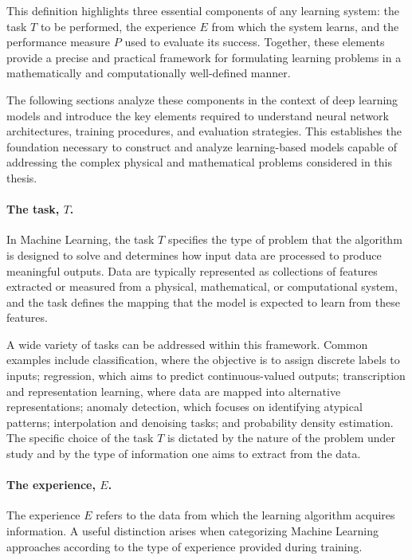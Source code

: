 This definition highlights three essential components of any learning system: the task $T$ to be performed, the experience $E$ from which the system learns, and the performance measure $P$ used to evaluate its success. Together, these elements provide a precise and practical framework for formulating learning problems in a mathematically and computationally well-defined manner.

The following sections analyze these components in the context of deep learning models and introduce the key elements required to understand neural network architectures, training procedures, and evaluation strategies. This establishes the foundation necessary to construct and analyze learning-based models capable of addressing the complex physical and mathematical problems considered in this thesis.

\paragraph{The task, $T$.}
In Machine Learning, the task $T$ specifies the type of problem that the algorithm is designed to solve and determines how input data are processed to produce meaningful outputs. Data are typically represented as collections of features extracted or measured from a physical, mathematical, or computational system, and the task defines the mapping that the model is expected to learn from these features.

A wide variety of tasks can be addressed within this framework. Common examples include classification, where the objective is to assign discrete labels to inputs; regression, which aims to predict continuous-valued outputs; transcription and representation learning, where data are mapped into alternative representations; anomaly detection, which focuses on identifying atypical patterns; interpolation and denoising tasks; and probability density estimation. The specific choice of the task $T$ is dictated by the nature of the problem under study and by the type of information one aims to extract from the data.

\paragraph{The experience, $E$.}
The experience $E$ refers to the data from which the learning algorithm acquires information. A useful distinction arises when categorizing Machine Learning approaches according to the type of experience provided during training.

